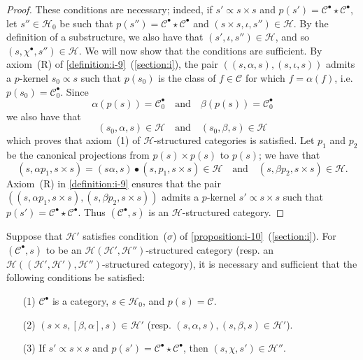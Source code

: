 \documentclass[a4paper,fleqn]{article}
\theoremstyle{plain}
\newenvironment{proposition}[1]
  {\renewcommand\theinnerproposition{#1}\innerproposition}
  {\endinnerproposition}
\theoremstyle{definition}
\newcommand{\oldpage}[1]{{\marginpar{\footnotesize$\bigg\vert$\,\,\,\,\textit{p.~#1}}}}
\newcommand{\textand}{\quad\text{and}\quad}
\newcommand{\CC}{\mathcal{C}}
\newcommand{\HH}{\mathcal{H}}
\newcommand{\subs}{\mathrel{\propto}}
\newcommand{\smallbullet}{\bullet}
\begin{document}
\begin{proof}
  These conditions are necessary;
  indeed, if $s'\subs s\times s$ and $p(s')=\CC^\smallbullet\star\CC^\smallbullet$, let $s''\in\HH_0$ be such that $p(s'')=\CC^\smallbullet\star\CC^\smallbullet$ and $(s\times s,\iota,s'')\in\HH$.
  By the definition of a substructure, we also have that $(s',\iota,s'')\in\HH$, and so $(s,\chi^\smallbullet,s'')\in\HH$.
  We will now show that the conditions are sufficient.
  \oldpage{411}
  By axiom~(R) of \cref{definition:i-9}~(\cref{section:i}), the pair $((s,\alpha,s),(s,\iota,s))$ admits a $p$-kernel $s_0\subs s$ such that $p(s_0)$ is the class of $f\in\CC$ for which $f=\alpha(f)$, i.e. $p(s_0)=\CC_0^\smallbullet$.
  Since
  \[
    \alpha(p(s))=\CC_0^\smallbullet
    \textand
    \beta(p(s))=\CC_0^\smallbullet
  \]
  we also have that
  \[
    (s_0,\alpha,s)\in\HH
    \textand
    (s_0,\beta,s)\in\HH
  \]
  which proves that axiom~(1) of $\HH$-structured categories is satisfied.
  Let $p_1$ and $p_2$ be the canonical projections from $p(s)\times p(s)$ to $p(s)$;
  we have that
  \[
    (s,\alpha p_1,s\times s)
    = (s\alpha,s)\smallbullet(s,p_1,s\times s)
    \in\HH
    \textand
    (s,\beta p_2,s\times s)
    \in\HH.
  \]
  Axiom~(R) in \cref{definition:i-9} ensures that the pair $((s,\alpha p_1,s\times s),(s,\beta p_2,s\times s))$ admits a $p$-kernel $s'\subs s\times s$ such that $p(s')=\CC^\smallbullet\star\CC^\smallbullet$.
  Thus $(\CC^\smallbullet,s)$ is an $\HH$-structured category.
\end{proof}

\begin{proposition}{28}
\label{proposition:ii-28}
  Suppose that $\HH'$ satisfies condition~($\sigma$) of \cref{proposition:i-10}~(\cref{section:i}).
  For $(\CC^\smallbullet,s)$ to be an $\HH(\HH',\HH'')$-structured category (resp. an $\HH((\HH',\HH'),\HH'')$-structured category), it is necessary and sufficient that the following conditions be satisfied:
  \begin{enumerate}
    \item[\normalfont(1)]
      $\CC^\smallbullet$ is a category, $s\in\HH_0$, and $p(s)=\CC$.
    \item[\normalfont(2)]
      $(s\times s,[\beta,\alpha],s)\in\HH'$ (resp. $(s,\alpha,s),(s,\beta,s)\in\HH'$).
    \item[\normalfont(3)]
      If $s'\subs s\times s$ and $p(s')=\CC^\smallbullet\star\CC^\smallbullet$, then $(s,\chi,s')\in\HH''$.
  \end{enumerate}
\end{proposition}
\end{document}
